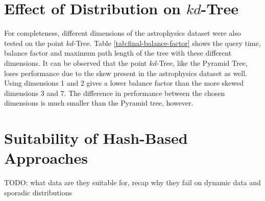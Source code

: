 \section{Effect of Distribution on $kd$-Tree}

For completeness, different dimensions of the astrophysics dataset were also tested on the point $kd$-Tree. Table \ref{tab:final-balance-factor} shows the query time, balance factor and maximum path length of the tree with these different dimensions. It can be observed that the point $kd$-Tree, like the Pyramid Tree, loses performance due to the skew present in the astrophysics dataset as well. Using dimensions 1 and 2 gives a lower balance factor than the more skewed dimensions 3 and 7. The difference in performance between the chosen dimensions is much smaller than the Pyramid tree, however.

\begin{table}
	\centering
	\caption{Point $kd$-Tree Statistics with Different Dimensions of Astrophysics Dataset}
	\label{tab:final-balance-factor}
\end{table}

\section{Suitability of Hash-Based Approaches}

TODO: what data are they suitable for, recap why they fail on dynamic data and sporadic distributions